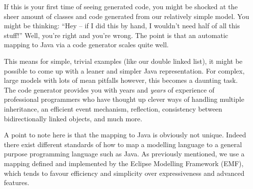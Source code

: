 If this is your first time of seeing generated code, you might be shocked at the sheer amount of classes and code generated from our relatively simple model.
You might be thinking: ``Hey -- if I did this by hand, I wouldn't need half of all this stuff!''  Well, you're right and you're wrong. The point is that an
automatic mapping to Java via a code generator scales quite well.

This means for simple, trivial examples (like our double linked list), it might be possible to come up with a leaner and simpler Java representation. For
complex, large models with lots of mean pitfalls however, this becomes a daunting task. The code generator provides you with years and \emph{years} of
experience of professional programmers who have thought up clever ways of handling multiple inheritance, an efficient event mechanism, reflection, consistency
between bidirectionally linked objects, and much more.

A point to note here is that the mapping to Java is obviously not unique. Indeed there exist different standards of how to map a modelling language to a
general purpose programming language such as Java. As previously mentioned, we use a mapping defined and implemented by the Eclipse Modelling Framework (EMF),
which tends to favour efficiency and simplicity over expressiveness and advanced features.

